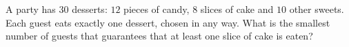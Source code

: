 A party has $30$ desserts: $12$ pieces of candy, $8$ slices of cake and $10$ other sweets. Each guest eats exactly one dessert, chosen in any way. What is the smallest number of guests that guarantees that at least one slice of cake is eaten?
